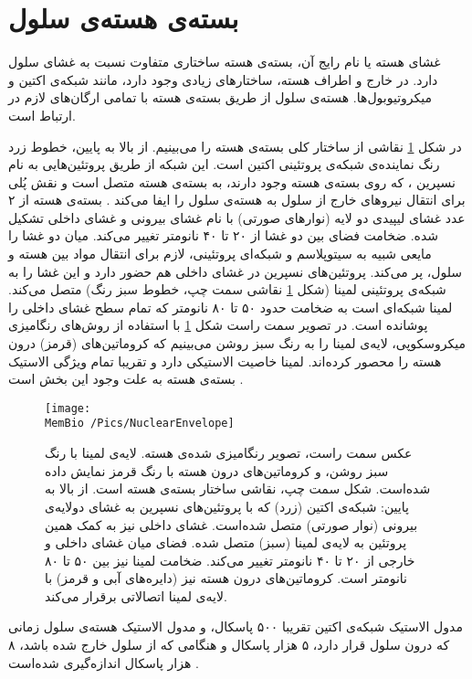 \setRL


\section{\label{sec:nuclearenvelope}
بسته‌ی هسته‌ی سلول
}
غشای هسته یا نام رایج آن، بسته‌ی هسته
ساختاری متفاوت نسبت به غشای سلول دارد. در خارج و اطراف هسته، ساختارهای زیادی وجود دارد، مانند شبکه‌ی اکتین
 و میکروتیوبول‌ها.
 هسته‌ی سلول از طریق بسته‌ی هسته با تمامی‌ ارگان‌های لازم در ارتباط است.

در شکل 
\ref{fig:nuclearenvelope}
نقاشی از ساختار کلی بسته‌ی هسته را می‌بینیم. از بالا به پایین، خطوط زرد رنگ نماینده‌ی شبکه‌ی پروتئینی اکتین است. این شبکه از طریق پروتئین‌هایی به نام نسپرین
، که روی بسته‌ی هسته وجود دارند، به بسته‌ی هسته متصل است و نقش پُلی برای انتقال نیرو‌های خارج از سلول به هسته‌ی سلول را ایفا می‌کند
\cite{Lammerding2011}. بسته‌ی هسته از ۲ عدد غشای لیپیدی دو لایه (نوارهای صورتی) با نام غشای بیرونی و غشای داخلی تشکیل شده. ضخامت فضای بین دو غشا از ۲۰ تا ۴۰ نانومتر تغییر می‌کند. میان دو غشا را مایعی شبیه به سیتوپلاسم و شبکه‌ای پروتئینی، لازم برای انتقال مواد بین هسته و سلول، پر می‌کند. پروتئین‌های نسپرین  در غشای داخلی هم حضور دارد و این غشا را به شبکه‌ی پروتئینی لمینا
(شکل
\ref{fig:nuclearenvelope}
نقاشی سمت چپ، خطوط سبز‌ رنگ) متصل می‌کند. لمینا‌ شبکه‌ای است به ضخامت حدود ۵۰ تا ۸۰ نانومتر که تمام سطح غشای داخلی را پوشانده است. در تصویر سمت راست شکل 
\ref{fig:nuclearenvelope}
با استفاده از روش‌های رنگامیزی میکروسکوپی، لایه‌ی لمینا را به رنگ سبز روشن می‌بینیم که کروماتین‌های (قرمز) درون هسته را محصور کرده‌اند. لمینا خاصیت الاستیکی دارد و تقریبا تمام ویژگی الاستیک بسته‌ی هسته به علت وجود این بخش است
\cite{Steensel2017wd}.


\begin{figure}[h]
\begin{center}
\texttt{[image: \\MemBio /Pics/NuclearEnvelope]}
\caption{
عکس سمت راست، تصویر رنگامیزی شده‌ی هسته. لایه‌ی لمینا با رنگ سبز روشن، و کروماتین‌های درون هسته با رنگ قرمز نمایش داده‌ شده‌است. شکل سمت چپ، نقاشی ساختار بسته‌ی هسته است. از بالا به پایین: شبکه‌ی اکتین (زرد) که با پروتئین‌های نسپرین به غشای دولایه‌ی بیرونی (نوار صورتی) متصل شده‌است. غشای داخلی نیز به کمک همین پروتئین به لایه‌ی لمینا (سبز) متصل شده. فضای میان غشای داخلی و خارجی از ۲۰ تا ۴۰ نانومتر تغییر می‌کند. ضخامت لمینا نیز بین ۵۰ تا ۸۰ نانومتر است. کروماتین‌های درون هسته نیز (دایره‌های آبی و قرمز) با لایه‌ی لمینا اتصالاتی برقرار می‌کند. 
}
\label{fig:nuclearenvelope}
\end{center}
\end{figure}
مدول الاستیک شبکه‌ی اکتین تقریبا ۵۰۰ پاسکال، و مدول الاستیک هسته‌ی سلول زمانی که درون سلول قرار دارد، ۵ هزار پاسکال و هنگامی ‌که از سلول خارج شده باشد، ۸ هزار پاسکال اندازه‌گیری شده‌است
\cite{Dahl2004, CAILLE2002177}.







